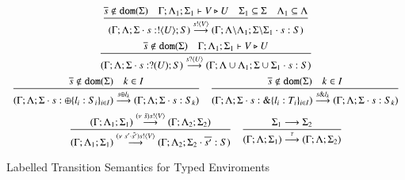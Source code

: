 \begin{figure}
	\[
	\begin{array}{c}
		\tree{
			\dual{s} \notin \dom{\Sigma} \quad \Gamma; \Lambda_1; \Sigma_1 \proves V \hastype U \quad \Sigma_1 \subseteq \Sigma \quad \Lambda_1 \subseteq \Lambda
		}{
			(\Gamma; \Lambda; \Sigma \cat s: \btout{U} S) \by{\bactout{s}{V}} (\Gamma; \Lambda\backslash\Lambda_1; \Sigma\backslash\Sigma_1 \cat s: S)
		}
		\\[6mm]
		\tree{
			\dual{s} \notin \dom{\Sigma} \quad  \Gamma; \Lambda_1; \Sigma_1 \proves V \hastype U
		}{
			(\Gamma; \Lambda; \Sigma \cat s: \btinp{U} S) \by{\bactinp{s}{U}} (\Gamma; \Lambda \cup \Lambda_1; \Sigma \cup \Sigma_1 \cat s: S)
		}
		\\[6mm]
		\tree{
			\dual{s} \notin \dom{\Sigma} \quad k \in I
		}{
			(\Gamma; \Lambda; \Sigma \cat s: \btsel{l_i: S_i}_{i \in I}) \by{\bactsel{s}{l_k}} (\Gamma; \Lambda; \Sigma \cat s:S_k)
		}
		\quad
		\tree{
			\dual{s} \notin \dom{\Sigma} \quad k \in I
		}{
			(\Gamma; \Lambda; \Sigma \cat s: \btbra{l_i: T_i}_{i \in I}) \by{\bactbra{s}{l_k}} (\Gamma; \Lambda; \Sigma \cat s:S_k)
		}
		\\[6mm]

		\tree{
			(\Gamma; \Lambda_1; \Sigma_1) \by{\news{\tilde{s}} \bactout{s}{V}} (\Gamma; \Lambda_2; \Sigma_2)
		}{
			(\Gamma; \Lambda_1; \Sigma_1) \by{\news{s' \cat \tilde{s'}} \bactout{s}{V}} (\Gamma; \Lambda_2; \Sigma_2 \cat \dual{s'}: S)
		}
		\quad
		\tree{
			\Sigma_1 \red \Sigma_2
		}{
			(\Gamma; \Lambda; \Sigma_1) \by{\tau} (\Gamma; \Lambda; \Sigma_2)
		}
	\end{array}
	\]
	\caption{Labelled Transition Semantics for Typed Enviroments \label{fig:envLTS}}
\end{figure}
